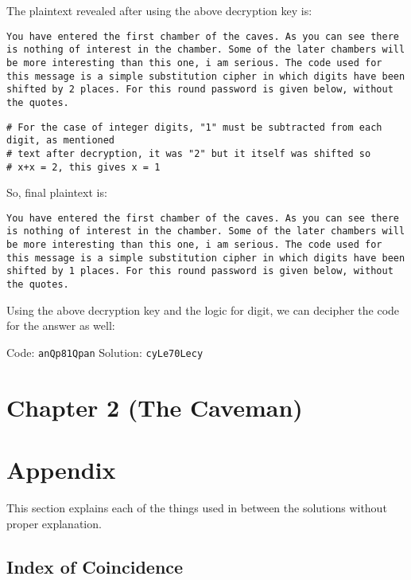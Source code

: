 \documentclass[10pt,twoside]{article}
\begin{document}
The plaintext revealed after using the above decryption key is: \newline

\texttt{You  have  entered  the  first  chamber  of  the  caves.  As  you  can  see  there  is  nothing  of  interest  in  the  chamber.  Some  of  the  later  chambers  will  be  more  interesting  than  this  one,  i  am  serious.  The  code  used  for  this  message  is  a  simple  substitution  cipher  in  which  digits  have  been  shifted  by  2  places.  For  this  round  password  is  given  below,  without  the  quotes.}

\begin{verbatim}
# For the case of integer digits, "1" must be subtracted from each digit, as mentioned
# text after decryption, it was "2" but it itself was shifted so
# x+x = 2, this gives x = 1
\end{verbatim}

So, final plaintext is: \newline

\texttt{You  have  entered  the  first  chamber  of  the  caves.  As  you  can  see  there  is  nothing  of  interest  in  the  chamber.  Some  of  the  later  chambers  will  be  more  interesting  than  this  one,  i  am  serious.  The  code  used  for  this  message  is  a  simple  substitution  cipher  in  which  digits  have  been  shifted  by  1  places.  For  this  round  password  is  given  below,  without  the  quotes.} \newline

Using the above decryption key and the logic for digit, we can decipher the code for the answer as well: \newline

Code: \texttt{anQp81Qpan} \newline
Solution: \texttt{cyLe70Lecy}

\section{Chapter 2 (The Caveman)}


\section{Appendix}

This section explains each of the things used in between the solutions without proper explanation.

\subsection{Index of Coincidence}
\end{document}
